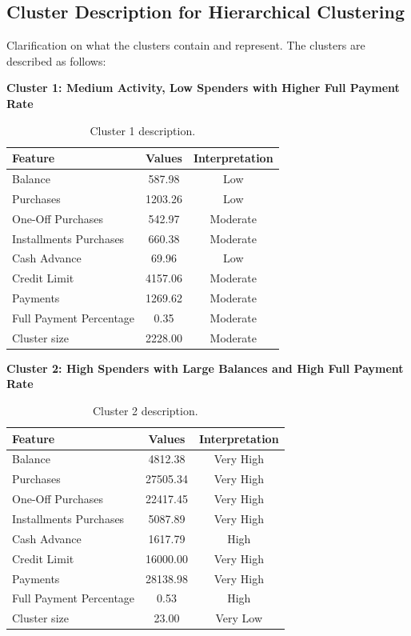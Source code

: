\subsection{Cluster Description for Hierarchical Clustering}
Clarification on what the clusters contain and represent. The clusters are described as follows:
\vspace{0.3cm}
\par
\begin{center}
\textbf{Cluster 1: Medium Activity, Low Spenders with Higher Full Payment Rate}
\begin{table}[H]
\centering
\begin{tabular}{|l|c|c|}
\hline
\textbf{Feature} & \textbf{Values} & \textbf{Interpretation} \\ \hline
Balance & 587.98 & Low \\ \hline
Purchases & 1203.26 & Low \\ \hline
One-Off Purchases & 542.97 & Moderate \\ \hline
Installments Purchases & 660.38 & Moderate \\ \hline
Cash Advance & 69.96 & Low \\ \hline
Credit Limit & 4157.06 & Moderate \\ \hline
Payments & 1269.62 & Moderate \\ \hline
Full Payment Percentage & 0.35 & Moderate \\ \hline
Cluster size & 2228.00 & Moderate \\ \hline
\end{tabular}
\caption{Cluster 1 description.}
\end{table}

\centering
\textbf{Cluster 2: High Spenders with Large Balances and High Full Payment Rate}
\begin{table}[H]
\centering
\begin{tabular}{|l|c|c|}
\hline
\textbf{Feature} & \textbf{Values} & \textbf{Interpretation} \\ \hline
Balance & 4812.38 & Very High \\ \hline
Purchases & 27505.34 & Very High \\ \hline
One-Off Purchases & 22417.45 & Very High \\ \hline
Installments Purchases & 5087.89 & Very High \\ \hline
Cash Advance & 1617.79 & High \\ \hline
Credit Limit & 16000.00 & Very High \\ \hline
Payments & 28138.98 & Very High \\ \hline
Full Payment Percentage & 0.53 & High \\ \hline
Cluster size & 23.00 & Very Low \\ \hline
\end{tabular}
\caption{Cluster 2 description.}
\end{table}


\end{center}

